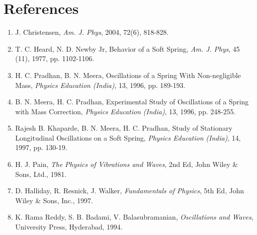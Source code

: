 \section*{References}

\begin{enumerate}
\itemsep0em
\item J. Christensen, \textit{Am. J. Phys}, 2004, 72(6), 818-828.

\item T. C. Heard, N. D. Newby Jr, Behavior of a Soft Spring, \textit{Am. J. Phys}, 45 (11), 1977,
pp. 1102-1106. 

\item H. C. Pradhan, B. N. Meera, Oscillations of a Spring With Non-negligible Mass, \textit{Physics Education (India)}, 13, 1996, pp. 189-193.

\item B. N. Meera, H. C. Pradhan, Experimental Study of Oscillations of a Spring with Mass Correction, \textit{Physics Education (India)}, 13, 1996, pp. 248-255.

\item Rajesh B. Khaparde, B. N. Meera, H. C. Pradhan, Study of Stationary Longitudinal Oscillations on a Soft Spring, \textit{Physics Education (India)}, 14, 1997, pp. 130-19. 

\item H. J. Pain, \textit{The Physics of Vibrations and Waves}, 2nd Ed, John Wiley \& Sons, Ltd., 1981.

\item D. Halliday, R. Resnick, J. Walker, \textit{Fundamentals of Physics}, 5th Ed, John Wiley \& Sons, Inc., 1997.

\item K. Rama Reddy, S. B. Badami, V. Balasubramanian, \textit{Oscillations and Waves}, University
Press, Hyderabad, 1994.
\end{enumerate}

\newpage